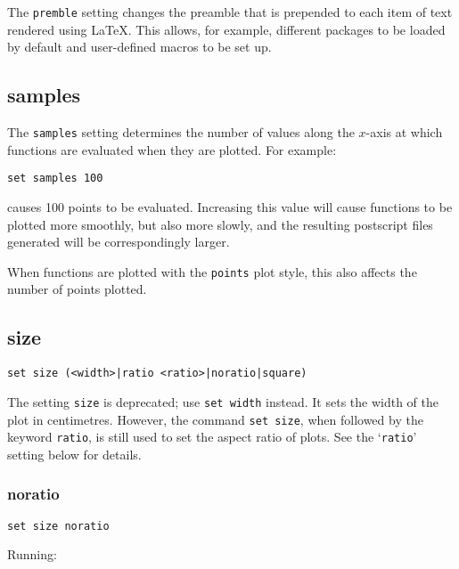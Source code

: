 \documentclass[a4paper,onecolumn,11pt]{book}
\begin{document}
The {\tt premble} setting changes the preamble that is prepended to each item of
text rendered using \LaTeX{}.  This allows, for example, different packages to
be loaded by default and user-defined macros to be set up.

\subsection{samples}

The {\tt samples} setting determines the number of values along the $x$-axis at
which functions are evaluated when they are plotted. For example:

\begin{verbatim}
set samples 100
\end{verbatim}

\noindent causes 100 points to be evaluated.  Increasing this value will cause functions
to be plotted more smoothly, but also more slowly, and the resulting postscript
files generated will be correspondingly larger.

When functions are plotted with the {\tt points} plot style, this also affects
the number of points plotted.


\subsection{size}

\begin{verbatim}
set size (<width>|ratio <ratio>|noratio|square)
\end{verbatim}

The setting {\tt size} is deprecated; use {\tt set width} instead.  It sets the
width of the plot in centimetres. However, the command {\tt set size}, when
followed by the keyword {\tt ratio}, is still used to set the aspect ratio of
plots. See the `{\tt ratio}' setting below for details.

\subsubsection{noratio}

\begin{verbatim}
set size noratio
\end{verbatim}

Running:
\end{document}
